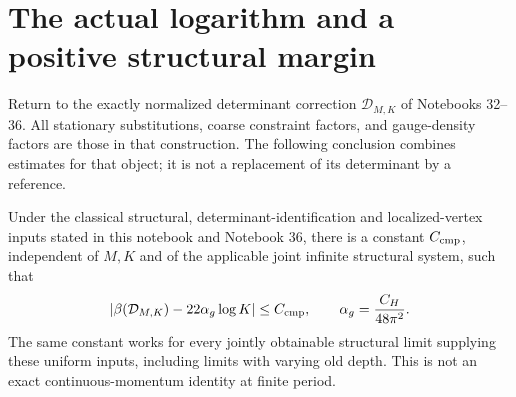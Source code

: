 \section{The actual logarithm and a positive structural margin}
\label{apb-section}

Return to the exactly normalized determinant correction
\(\mathcal D_{M,K}\) of Notebooks 32--36. All stationary substitutions,
coarse constraint factors, and gauge-density factors are those in
that construction. The following conclusion combines estimates for
that object; it is not a replacement of its determinant by a reference.

\begin{theorem}
\label{apb-main}
Under the classical structural, determinant-identification and
localized-vertex inputs stated in this notebook and Notebook 36,
there is a constant \(C_{\rm cmp}\), independent of \(M,K\) and of
the applicable joint infinite structural system, such that
\begin{equation}
 \left|\beta(\mathcal D_{M,K})
                    -22\alpha_g\log K\right|\le C_{\rm cmp},
 \qquad \alpha_g=\frac{C_H}{48\pi^2}.
 \label{apb-coefficient}
\end{equation}
The same constant works for every jointly obtainable structural limit
supplying these uniform inputs, including limits with varying old depth.
This is not an exact continuous-momentum identity at finite period.
\end{theorem}


